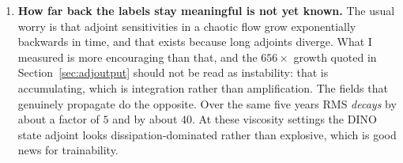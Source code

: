 \begin{enumerate}
  \item \textbf{How far back the labels stay meaningful is not yet known.}
        The usual worry is that adjoint sensitivities in a chaotic flow grow
        exponentially backwards in time, and that  exists
        because long adjoints diverge. What I measured is more encouraging than
        that, and the $656\times$ growth quoted in Section~\ref{sec:adjoutput} should not be
        read
        as instability: that is  accumulating, which is
        integration rather than amplification. The fields that genuinely
        propagate do the opposite. Over the same five years  RMS
        \emph{decays} by about a factor of $5$ and  by about
        $40$. At these viscosity settings the DINO state adjoint looks
        dissipation-dominated rather than explosive, which is good news for
        trainability.


\end{enumerate}
